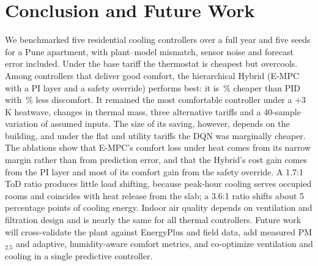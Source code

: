 \section{Conclusion and Future Work}\label{sec:conclusion}
We benchmarked five residential cooling controllers over a full year and five seeds
for a Pune apartment, with plant--model mismatch, sensor noise and forecast error
included. Under the base tariff the thermostat is cheapest but overcools. Among
controllers that deliver good comfort, the hierarchical Hybrid (E-MPC with a PI layer
and a safety override) performs best: it is \RelHybPidCost\,\% cheaper than PID with
\RelHybPidKh\,\% less discomfort. It remained the most comfortable controller under a
+3\,K heatwave, changes in thermal mass, three alternative tariffs and a 40-sample
variation of assumed inputs. The size of its saving, however, depends on the building,
and under the flat and utility tariffs the DQN was marginally cheaper.
The ablations show that E-MPC's comfort loss under heat comes from its narrow margin
rather than from prediction error, and that the Hybrid's cost gain comes from the PI
layer and most of its comfort gain from the safety override. A 1.7:1 ToD ratio produces
little load shifting, because peak-hour cooling serves occupied rooms and coincides with
heat release from the slab; a 3.6:1 ratio shifts about 5 percentage points of cooling
energy. Indoor air quality depends on ventilation and filtration design and is nearly the same
for all thermal controllers. Future work will cross-validate
the plant against EnergyPlus and field data, add measured PM$_{2.5}$ and adaptive,
humidity-aware comfort metrics, and co-optimize ventilation and cooling in a single
predictive controller.
